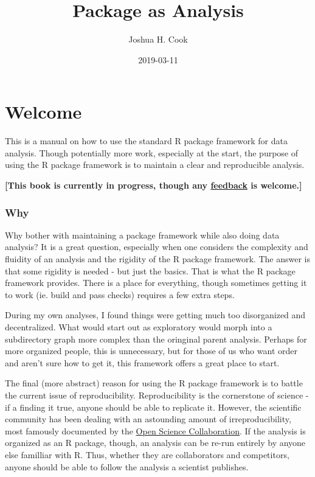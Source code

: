 \documentclass[]{book}
\title{Package as Analysis}
\author{Joshua H. Cook}
\date{2019-03-11}
\begin{document}
\maketitle

{
\setcounter{tocdepth}{1}
\tableofcontents
}
\hypertarget{welcome}{%
\chapter*{Welcome}\label{welcome}}

This is a manual on how to use the standard R package framework for data analysis. Though potentially more work, especially at the start, the purpose of using the R package framework is to maintain a clear and reproducible analysis.

\textbf{{[}This book is currently in progress, though any \href{https://github.com/jhrcook/package-as-analysis/issues}{feedback} is welcome.{]}}

\hypertarget{why}{%
\subsection*{Why}\label{why}}

Why bother with maintaining a package framework while also doing data analysis? It is a great question, especially when one considers the complexity and fluidity of an analysis and the rigidity of the R package framework. The answer is that some rigidity is needed - but just the basics. That is what the R package framework provides. There is a place for everything, though sometimes getting it to work (ie. build and pass checks) requires a few extra steps.

During my own analyses, I found things were getting much too disorganized and decentralized. What would start out as exploratory would morph into a subdirectory graph more complex than the oringinal parent analysis. Perhaps for more organized people, this is unnecessary, but for those of us who want order and aren't sure how to get it, this framework offers a great place to start.

The final (more abstract) reason for using the R package framework is to battle the current issue of reproducibility. Reproducibility is the cornerstone of science - if a finding it true, anyone should be able to replicate it. However, the scientific community has been dealing with an astounding amount of irreproducibility, most famously documented by the \href{http://science.sciencemag.org/content/349/6251/aac4716}{Open Science Collaboration}. If the analysis is organized as an R package, though, an analysis can be re-run entirely by anyone else familliar with R. Thus, whether they are collaborators and competitors, anyone should be able to follow the analysis a scientist publishes.
\end{document}
